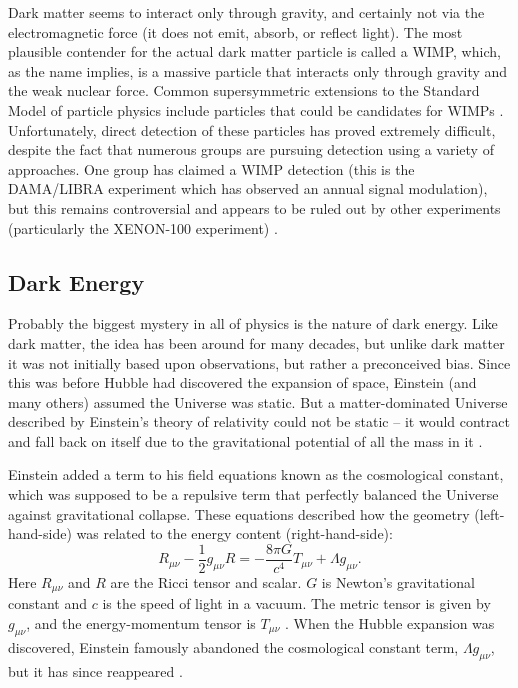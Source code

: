 Dark matter seems to interact only through gravity, and certainly not via the electromagnetic force (it does not emit, absorb, or reflect light). The most plausible contender for the actual dark matter particle is called a \acf{WIMP}, which, as the name implies, is a massive particle that interacts only through gravity and the weak nuclear force. Common supersymmetric extensions to the Standard Model of particle physics include particles that could be candidates for \ac{WIMP}s \citep[][\textcolor{red}{replace with specifically-WIMP review}]{DodelsonText}. Unfortunately, direct detection of these particles has proved extremely difficult, despite the fact that numerous groups are pursuing detection using a variety of approaches. One group has claimed a WIMP detection (this is the DAMA/LIBRA experiment which has observed an annual signal modulation), but this remains controversial and appears to be ruled out by other experiments (particularly the XENON-100 experiment) \citep{Snowmass13}.

\subsection{Dark Energy}
\label{sec:DE}

Probably the biggest mystery in all of physics is the nature of dark energy. Like dark matter, the idea has been around for many decades, but unlike dark matter it was not initially based upon observations, but rather a preconceived bias. Since this was before Hubble had discovered the expansion of space, Einstein (and many others) assumed the Universe was static. But a matter-dominated Universe described by Einstein's theory of relativity could not be static -- it would contract and fall back on itself due to the gravitational potential of all the mass in it \citep{RydenText}. 

Einstein added a term to his field equations known as the cosmological constant, which was supposed to be a repulsive term that perfectly balanced the Universe against gravitational collapse. These equations described how the geometry (left-hand-side) was related to the energy content (right-hand-side):
\begin{equation}
R_{\mu\nu} - \frac{1}{2} g_{\mu\nu} R =  -\frac{8\pi G}{c^4} T_{\mu\nu} + \Lambda g_{\mu\nu}.
\label{eq:Einstein}
\end{equation}
Here $R_{\mu\nu}$ and $R$ are the Ricci tensor and scalar. $G$ is Newton's gravitational constant and $c$ is the speed of light in a vacuum. The metric tensor is given by $g_{\mu\nu}$,  and the energy-momentum tensor is $T_{\mu\nu}$ \citep[e.g.][]{Bertone05}. When the Hubble expansion was discovered, Einstein famously abandoned the cosmological constant term, $\Lambda g_{\mu\nu}$, but it has since reappeared \citep{RydenText}.

